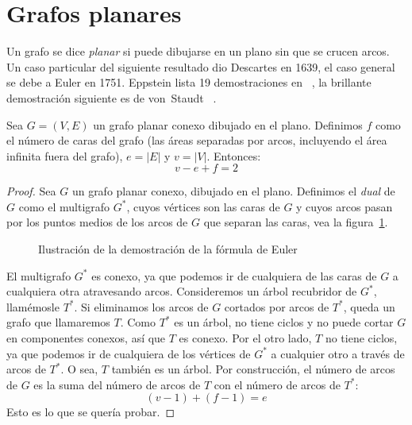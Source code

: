 \section{Grafos planares}
\label{sec:grafos-planares}

  Un grafo se dice \emph{planar} si puede dibujarse en un plano
  sin que se crucen arcos.
  Un caso particular del siguiente resultado
  dio Descartes en 1639,%
  el caso general se debe a Euler en 1751.%
  Eppstein lista 19 demostraciones en~%
    \cite{eppstein05:_nineteen_proofs_Euler},
  la brillante demostración siguiente es de von~Staudt~%
    \cite{staudt47:_geometrie_lage}.
  \begin{theorem}
    Sea \(G = (V, E)\) un grafo planar conexo dibujado en el plano.
    Definimos \(f\) como el número de caras del grafo
    (las áreas separadas por arcos,
     incluyendo el área infinita fuera del grafo),
    \(e = \lvert E \rvert\) y \(v = \lvert V \rvert\).
    Entonces:
    \begin{equation*}
      v - e + f
	= 2
    \end{equation*}
  \end{theorem}
  \begin{proof}
    Sea \(G\) un grafo planar conexo,
    dibujado en el plano.
    Definimos el \emph{dual} de \(G\) como el multigrafo \(G^*\),
    cuyos vértices son las caras de \(G\)
    y cuyos arcos pasan por los puntos medios de los arcos de \(G\)
    que separan las caras,
    vea la figura~\ref{fig:Euler-formula}.
    \begin{figure}[ht]
      \centering
      \caption{Ilustración de la demostración de la fórmula de Euler }
      \label{fig:Euler-formula}
    \end{figure}
    El multigrafo \(G^*\) es conexo,%
    ya que podemos ir de cualquiera de las caras de \(G\)
    a cualquiera otra atravesando arcos.
    Consideremos un árbol recubridor de \(G^*\),%
    llamémosle \(T^*\).
    Si eliminamos los arcos de \(G\) cortados por arcos de \(T^*\),
    queda un grafo que llamaremos \(T\).
    Como \(T^*\) es un árbol,
    no tiene ciclos y no puede cortar \(G\) en componentes conexos,
    así que \(T\) es conexo.
    Por el otro lado,
    \(T\) no tiene ciclos,
    ya que podemos ir de cualquiera de los vértices de \(G^*\)
    a cualquier otro a través de arcos de \(T^*\).
    O sea,
    \(T\) también es un árbol.
    Por construcción,
    el número de arcos de \(G\)
    es la suma del número de arcos de \(T\)
    con el número de arcos de \(T^*\):
    \begin{equation*}
      (v - 1) + (f - 1)
	= e
    \end{equation*}
    Esto es lo que se quería probar.
  \end{proof}

